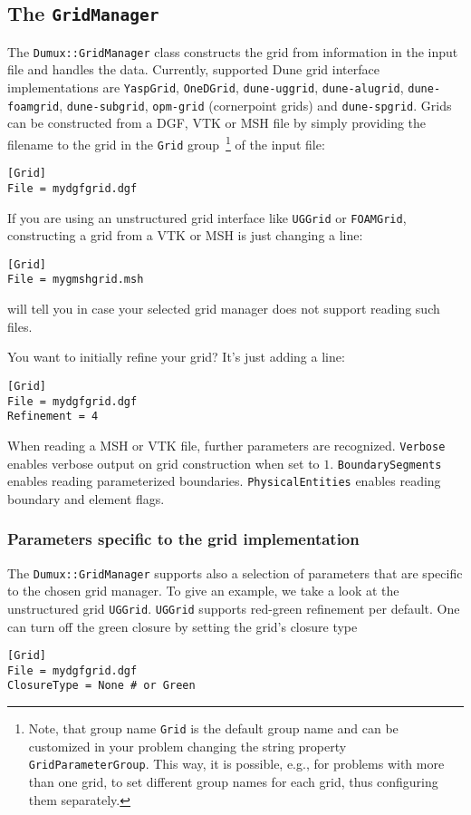 \subsection{The \Dumux \texttt{GridManager}}
The \texttt{Dumux::GridManager} class constructs the grid from information in the input file and handles the data.
Currently, supported Dune grid interface implementations  are \texttt{YaspGrid}, \texttt{OneDGrid}, \texttt{dune-uggrid}, \texttt{dune-alugrid}, \texttt{dune-foamgrid}, \texttt{dune-subgrid}, \texttt{opm-grid} (cornerpoint grids) and \texttt{dune-spgrid}.
Grids can be constructed from a DGF, VTK or MSH file by simply providing the filename to the grid in the \texttt{Grid} group~\footnote{Note,
that group name \texttt{Grid} is the default group name and can be customized in your problem changing the string property \texttt{GridParameterGroup}.
This way, it is possible, e.g., for problems with more than one grid, to set different group names for each grid, thus configuring them separately.}
of the input file:
\begin{lstlisting}[style=DumuxParameterFile]
[Grid]
File = mydgfgrid.dgf
\end{lstlisting}

If you are using an unstructured grid interface like \texttt{UGGrid} or \texttt{FOAMGrid}, constructing a grid from a VTK or MSH is just changing a line:
\begin{lstlisting}[style=DumuxParameterFile]
[Grid]
File = mygmshgrid.msh
\end{lstlisting}
\Dumux will tell you in case your selected grid manager does not support reading such files.

You want to initially refine your grid? It's just adding a line:
\begin{lstlisting}[style=DumuxParameterFile]
[Grid]
File = mydgfgrid.dgf
Refinement = 4
\end{lstlisting}

When reading a MSH or VTK file, further parameters are recognized. \texttt{Verbose} enables verbose output on grid construction when set to $1$.
\texttt{BoundarySegments} enables reading parameterized boundaries. \texttt{PhysicalEntities} enables reading boundary and element flags.

\subsubsection{Parameters specific to the grid implementation}
The \texttt{{Dumux::GridManager}} supports also a selection of parameters that are specific to the chosen grid manager.
To give an example, we take a look at the unstructured grid \texttt{UGGrid}.
\texttt{UGGrid} supports red-green refinement per default. One can turn off the green closure by setting the grid's closure type
\begin{lstlisting}[style=DumuxParameterFile]
[Grid]
File = mydgfgrid.dgf
ClosureType = None # or Green
\end{lstlisting}

